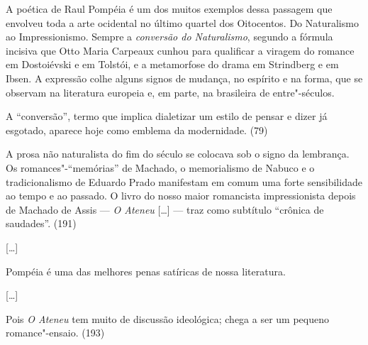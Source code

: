 
\smallskip

A poética de Raul Pompéia é um dos muitos exemplos dessa
passagem que envolveu toda a arte ocidental no último quartel dos
Oitocentos. Do Naturalismo ao Impressionismo. Sempre a
\textit{conversão do Naturalismo}, segundo a
fórmula incisiva que Otto Maria Carpeaux cunhou para qualificar a
viragem do romance em Dostoiévski e em Tolstói, e a metamorfose do
drama em Strindberg e em Ibsen. A expressão colhe alguns signos de
mudança, no espírito e na forma, que se observam na literatura europeia
e, em parte, na brasileira de entre"-séculos.

A ``conversão'', termo que implica dialetizar um estilo de pensar e dizer
já esgotado, aparece hoje como emblema da modernidade. (79)



A prosa não naturalista do fim do século se colocava
sob o signo da lembrança. Os romances"-``memórias'' de Machado, o
memorialismo de Nabuco e o tradicionalismo de Eduardo Prado manifestam
em comum uma forte sensibilidade ao tempo e ao passado. O livro do
nosso maior romancista impressionista depois de Machado de Assis --- 
\textit{O Ateneu} [\ldots] --- traz como subtítulo ``crônica de saudades''. (191)

[\ldots]

Pompéia é uma das melhores penas satíricas de nossa literatura.

[\ldots]

Pois \textit{O Ateneu} tem muito de discussão ideológica; 
chega a ser um pequeno romance"-ensaio.
(193) 



